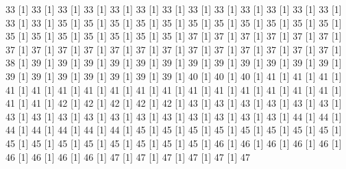 \documentclass[12pt]{article}
\begin{document}
\begin{Schunk}
\begin{Soutput}
[1] 33%
[1] 33%
[1] 33%
[1] 33%
[1] 33%
[1] 33%
[1] 33%
[1] 33%
[1] 33%
[1] 33%
[1] 33%
[1] 33%
[1] 33%
[1] 33%
[1] 33%
[1] 35%
[1] 35%
[1] 35%
[1] 35%
[1] 35%
[1] 35%
[1] 35%
[1] 35%
[1] 35%
[1] 35%
[1] 35%
[1] 35%
[1] 35%
[1] 35%
[1] 35%
[1] 35%
[1] 35%
[1] 35%
[1] 37%
[1] 37%
[1] 37%
[1] 37%
[1] 37%
[1] 37%
[1] 37%
[1] 37%
[1] 37%
[1] 37%
[1] 37%
[1] 37%
[1] 37%
[1] 37%
[1] 37%
[1] 37%
[1] 37%
[1] 37%
[1] 37%
[1] 38%
[1] 39%
[1] 39%
[1] 39%
[1] 39%
[1] 39%
[1] 39%
[1] 39%
[1] 39%
[1] 39%
[1] 39%
[1] 39%
[1] 39%
[1] 39%
[1] 39%
[1] 39%
[1] 39%
[1] 39%
[1] 39%
[1] 39%
[1] 40%
[1] 40%
[1] 40%
[1] 41%
[1] 41%
[1] 41%
[1] 41%
[1] 41%
[1] 41%
[1] 41%
[1] 41%
[1] 41%
[1] 41%
[1] 41%
[1] 41%
[1] 41%
[1] 41%
[1] 41%
[1] 41%
[1] 41%
[1] 41%
[1] 42%
[1] 42%
[1] 42%
[1] 42%
[1] 42%
[1] 43%
[1] 43%
[1] 43%
[1] 43%
[1] 43%
[1] 43%
[1] 43%
[1] 43%
[1] 43%
[1] 43%
[1] 43%
[1] 43%
[1] 43%
[1] 43%
[1] 43%
[1] 43%
[1] 43%
[1] 44%
[1] 44%
[1] 44%
[1] 44%
[1] 44%
[1] 44%
[1] 44%
[1] 45%
[1] 45%
[1] 45%
[1] 45%
[1] 45%
[1] 45%
[1] 45%
[1] 45%
[1] 45%
[1] 45%
[1] 45%
[1] 45%
[1] 45%
[1] 45%
[1] 45%
[1] 45%
[1] 46%
[1] 46%
[1] 46%
[1] 46%
[1] 46%
[1] 46%
[1] 46%
[1] 46%
[1] 46%
[1] 47%
[1] 47%
[1] 47%
[1] 47%
[1] 47%
[1] 47%

\end{Soutput}
\end{Schunk}
\end{document}
